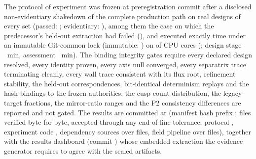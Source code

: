 The protocol of experiment \texttt{\CtvExperimentId} was frozen at
preregistration commit \texttt{\CtvPreregCommit} after a disclosed
non-evidentiary shakedown of the complete production path on
\CtvShakedownDesigns{} real designs of every set (passed: \CtvShakedownPassed;
evidentiary: \CtvShakedownEvidentiary), among them the case on which the
predecessor's held-out extraction had failed
(\texttt{\CtvShakedownDefectDesign}), and executed exactly \CtvAttemptCount{}
time under an immutable Git-common lock (immutable: \CtvLockImmutable) on
\CtvWorkerPool{} of \CtvCpuCount{} CPU cores (\texttt{\CtvDevice}; design stage
\CtvStageWallMin{}~min, assessment \CtvAssessmentWallMin{}~min). The
\CtvBindingGateCount{} binding integrity gates require every declared design
resolved, every identity proven, every axis null converged, every separatrix
trace terminating cleanly, every wall trace consistent with its flux root,
refinement stability, the held-out correspondences, bit-identical determinism
replays and the hash bindings to the frozen authorities; the cusp-count
distribution, the legacy-target fractions, the mirror-ratio ranges and the P2
consistency differences are reported and not gated. The results are committed
at \texttt{\CtvResultsCommit} (manifest hash prefix
\texttt{\CtvManifestSha}; \CtvVerifiedFiles{} files verified byte for byte,
\CtvToleratedEolFiles{} accepted through any end-of-line tolerance; protocol
\texttt{\CtvProtocolSha}, experiment code \texttt{\CtvExperimentCodeSha},
dependency sources \texttt{\CtvDependencySourceSha} over
\CtvDependencySourceFiles{} files, field pipeline \texttt{\CtvFieldPipelineSha}
over \CtvFieldPipelineFiles{} files), together with the results dashboard
(commit \texttt{\CtvDashboardCommit}) whose embedded extraction the evidence
generator requires to agree with the sealed artifacts.


